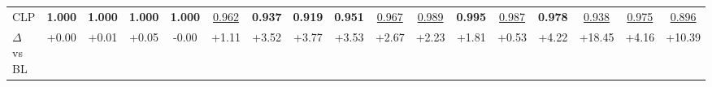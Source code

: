 \begin{tabular}{lcccccccccccccccc}
CLP & \cellcolor{cyan!25}\textbf{1.000} & \cellcolor{cyan!25}\textbf{1.000} & \cellcolor{cyan!25}\textbf{1.000} & \cellcolor{cyan!25}\textbf{1.000} & \cellcolor{orange!25}\underline{0.962} & \cellcolor{cyan!25}\textbf{0.937} & \cellcolor{cyan!25}\textbf{0.919} & \cellcolor{cyan!25}\textbf{0.951} & \cellcolor{orange!25}\underline{0.967} & \cellcolor{orange!25}\underline{0.989} & \cellcolor{cyan!25}\textbf{0.995} & \cellcolor{orange!25}\underline{0.987} & \cellcolor{cyan!25}\textbf{0.978} & \cellcolor{orange!25}\underline{0.938} & \cellcolor{orange!25}\underline{0.975} & \cellcolor{orange!25}\underline{0.896} \\
\hspace*{1em}$\Delta$ vs BL & \textcolor{green!60!black}{+0.00} & \textcolor{green!60!black}{+0.01} & \textcolor{green!60!black}{+0.05} & \textcolor{orange!85!black}{-0.00} & \textcolor{green!60!black}{+1.11} & \textcolor{green!60!black}{+3.52} & \textcolor{green!60!black}{+3.77} & \textcolor{green!60!black}{+3.53} & \textcolor{green!60!black}{+2.67} & \textcolor{green!60!black}{+2.23} & \textcolor{green!60!black}{+1.81} & \textcolor{green!60!black}{+0.53} & \textcolor{green!60!black}{+4.22} & \textcolor{green!60!black}{+18.45} & \textcolor{green!60!black}{+4.16} & \textcolor{green!60!black}{+10.39} \\
\bottomrule
\end{tabular}
